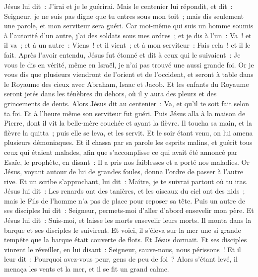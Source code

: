 \begin{multicols}{2}
Jésus lui dit~: J'irai et je le guérirai.
Mais le centenier lui répondit, et dit~: Seigneur, je ne suis pas digne que tu entres sous mon toit~; mais dis seulement une parole, et mon serviteur sera guéri.
Car moi-même qui suis un homme soumis à l'autorité d'un autre, j'ai des soldats sous mes ordres~; et je dis à l'un~: Va~! et il va~; et à un autre~: Viens~! et il vient~; et à mon serviteur~: Fais cela~! et il le fait.
Après l'avoir entendu, Jésus fut étonné et dit à ceux qui le suivaient~: Je vous le dis en vérité, même en Israël, je n'ai pas trouvé une aussi grande foi.
Or je vous dis que plusieurs viendront de l'orient et de l'occident, et seront à table dans le Royaume des cieux avec Abraham, Isaac et Jacob.
Et les enfants du Royaume seront jetés dans les ténèbres du dehors, où il y aura des pleurs et des grincements de dents.
Alors Jésus dit au centenier~: Va, et qu'il te soit fait selon ta foi. Et à l'heure même son serviteur fut guéri.
Puis Jésus alla à la maison de Pierre, dont il vit la belle-mère couchée et ayant la fièvre.
Il toucha sa main, et la fièvre la quitta~; puis elle se leva, et les servit.
Et le soir étant venu, on lui amena plusieurs démoniaques. Et il chassa par sa parole les esprits malins, et guérit tous ceux qui étaient malades,
afin que s'accomplisse ce qui avait été annoncé par Esaïe, le prophète, en disant~: Il a pris nos faiblesses et a porté nos maladies.
Or Jésus, voyant autour de lui de grandes foules, donna l'ordre de passer à l'autre rive.
Et un scribe s'approchant, lui dit~: Maître, je te suivrai partout où tu iras.
Jésus lui dit~: Les renards ont des tanières, et les oiseaux du ciel ont des nids~; mais le Fils de l'homme n'a pas de place pour reposer sa tête.
Puis un autre de ses disciples lui dit~: Seigneur, permets-moi d'aller d'abord ensevelir mon père.
Et Jésus lui dit~: Suis-moi, et laisse les morts ensevelir leurs morts.
Il monta dans la barque et ses disciples le suivirent.
Et voici, il s'éleva sur la mer une si grande tempête que la barque était couverte de flots. Et Jésus dormait.
Et ses disciples vinrent le réveiller, en lui disant~: Seigneur, sauve-nous, nous périssons~!
Et il leur dit~: Pourquoi avez-vous peur, gens de peu de foi~? Alors s'étant levé, il menaça les vents et la mer, et il se fit un grand calme.

\end{multicols}
